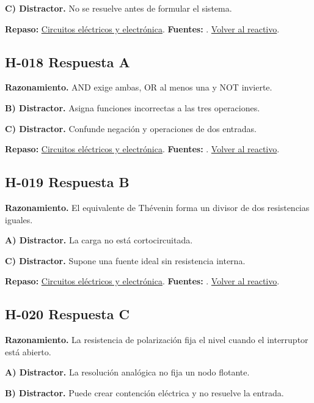 \textbf{C) Distractor. }No se resuelve antes de formular el sistema.

\textbf{Repaso:} \hyperref[sec:h1]{Circuitos eléctricos y electrónica}. \textbf{Fuentes:} \cite{openstax,electronics,digital}. \hyperref[q:H-017]{Volver al reactivo}.\par\medskip

\subsection*{H-018 \quad Respuesta A}\label{s:H-018}
\textbf{Razonamiento.} AND exige ambas, OR al menos una y NOT invierte.

\textbf{B) Distractor. }Asigna funciones incorrectas a las tres operaciones.

\textbf{C) Distractor. }Confunde negación y operaciones de dos entradas.

\textbf{Repaso:} \hyperref[sec:h1]{Circuitos eléctricos y electrónica}. \textbf{Fuentes:} \cite{openstax,electronics,digital}. \hyperref[q:H-018]{Volver al reactivo}.\par\medskip

\subsection*{H-019 \quad Respuesta B}\label{s:H-019}
\textbf{Razonamiento.} El equivalente de Thévenin forma un divisor de dos resistencias iguales.

\textbf{A) Distractor. }La carga no está cortocircuitada.

\textbf{C) Distractor. }Supone una fuente ideal sin resistencia interna.

\textbf{Repaso:} \hyperref[sec:h1]{Circuitos eléctricos y electrónica}. \textbf{Fuentes:} \cite{openstax,electronics,digital}. \hyperref[q:H-019]{Volver al reactivo}.\par\medskip

\subsection*{H-020 \quad Respuesta C}\label{s:H-020}
\textbf{Razonamiento.} La resistencia de polarización fija el nivel cuando el interruptor está abierto.

\textbf{A) Distractor. }La resolución analógica no fija un nodo flotante.

\textbf{B) Distractor. }Puede crear contención eléctrica y no resuelve la entrada.


